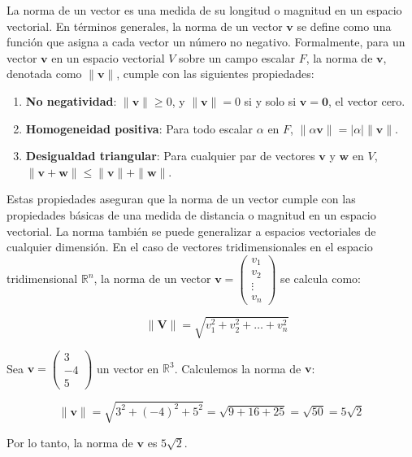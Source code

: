 \begin{definition}
La norma de un vector es una medida de su longitud o magnitud en un espacio vectorial. En términos generales, la norma de un vector $\mathbf{v}$ se define como una función que asigna a cada vector un número no negativo. Formalmente, para un vector $\mathbf{v}$ en un espacio vectorial $V$ sobre un campo escalar $F$, la norma de $\mathbf{v}$, denotada como $\|\mathbf{v}\|$, cumple con las siguientes propiedades:

\begin{enumerate}
    \item \textbf{No negatividad}: $\|\mathbf{v}\| \geq 0$, y $\|\mathbf{v}\| = 0$ si y solo si $\mathbf{v} = \mathbf{0}$, el vector cero.
    \item \textbf{Homogeneidad positiva}: Para todo escalar $\alpha$ en $F$, $\|\alpha \mathbf{v}\| = |\alpha| \|\mathbf{v}\|$.
    \item \textbf{Desigualdad triangular}: Para cualquier par de vectores $\mathbf{v}$ y $\mathbf{w}$ en $V$, $\|\mathbf{v} + \mathbf{w}\| \leq \|\mathbf{v}\| + \|\mathbf{w}\|$.
\end{enumerate}

Estas propiedades aseguran que la norma de un vector cumple con las propiedades básicas de una medida de distancia o magnitud en un espacio vectorial. La norma también se puede generalizar a espacios vectoriales de cualquier dimensión. En el caso de vectores tridimensionales en el espacio tridimensional $\mathbb{R}^n$, la norma de un vector $\mathbf{v} = \begin{pmatrix} v_1 \\ v_2 \\\vdots\\ v_n \end{pmatrix}$ se calcula como:

$$\quad \|\mathbf{V}\| = \sqrt{v_1^2 + v_2^2 + \ldots + v_n^2}$$

\end{definition}

\begin{example}
Sea $\mathbf{v} = \begin{pmatrix} 3 \\ -4 \\ 5 \end{pmatrix}$ un vector en $\mathbb{R}^3$. Calculemos la norma de $\mathbf{v}$:

\[
\|\mathbf{v}\| = \sqrt{3^2 + (-4)^2 + 5^2} = \sqrt{9 + 16 + 25} = \sqrt{50} = 5\sqrt{2}
\]

Por lo tanto, la norma de $\mathbf{v}$ es $5\sqrt{2}$.
    
\end{example}

